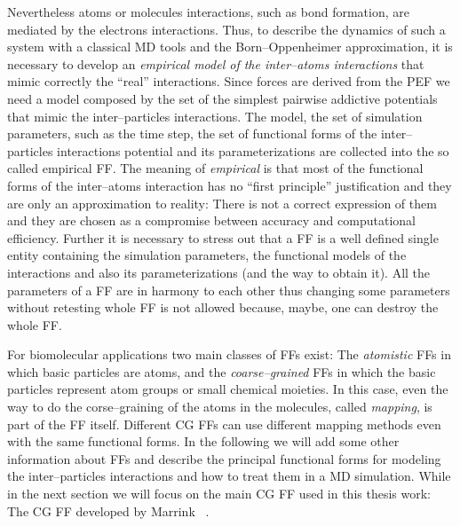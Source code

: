 Nevertheless atoms or molecules interactions, such as bond formation, are mediated by the electrons interactions.
Thus, to describe the dynamics of such a system with a classical \ac{MD} tools and the Born--Oppenheimer approximation, it is necessary to develop an \textit{empirical model of the inter--atoms interactions} that mimic correctly the ``real'' interactions. Since forces are derived from the \ac{PEF} we need a model composed by the set of the simplest pairwise addictive potentials that mimic the inter--particles interactions.
The model, the set of simulation parameters, such as the time step, the set of functional forms of the inter--particles interactions potential and its parameterizations are collected into the so called empirical \acf{FF}.
The meaning of \textit{empirical} is that most of the functional forms of the inter--atoms interaction has no ``first principle'' justification and they are only an approximation to reality: There is not a correct expression of them and they are chosen as a compromise between accuracy and computational efficiency. Further it is necessary to stress out that a \ac{FF} is a well defined single entity containing the simulation parameters, the functional models of the interactions and also its parameterizations (and the way to obtain it). All the parameters of a \ac{FF} are in harmony to each other thus changing some parameters without retesting whole \ac{FF} is not allowed because, maybe, one can destroy the whole \ac{FF}.

For biomolecular applications two main classes of \acp{FF} exist: The \textit{atomistic} \acp{FF} in which basic particles are atoms, and the \textit{coarse--grained} \acp{FF} in which the basic particles represent atom groups or small chemical moieties. In this case, even the way to do the corse--graining of the atoms in the molecules, called \textit{mapping}, is part of the \ac{FF} itself. Different \ac{CG} \acp{FF} can use different mapping methods even with the same functional forms. In the following we will add some other information about \acp{FF} and describe the principal functional forms for modeling the inter--particles interactions and how to treat them in a \ac{MD} simulation. While in the next section we will focus on the main \ac{CG} \ac{FF} used in this thesis work: The  \ac{CG} \ac{FF} developed by Marrink \etal\, \cite{Martini}.

